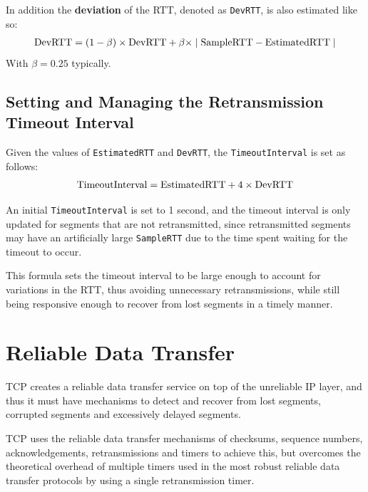 \documentclass[12pt letter]{report}
\begin{document}
In addition the \textbf{deviation} of the RTT, denoted as
\lstinline{DevRTT}, is also estimated like so:
\begin{align*}
  \text{\lstinline{DevRTT}} = (1 - \beta) \times
  \text{\lstinline{DevRTT}} + \beta \times  \mid \text{\lstinline{SampleRTT}} -
  \text{\lstinline{EstimatedRTT}} \mid
\end{align*}
With $\beta = 0.25$ typically.

\subsection{Setting and Managing the Retransmission Timeout Interval}

Given the values of \lstinline{EstimatedRTT} and \lstinline{DevRTT},
the \lstinline{TimeoutInterval} is set as follows:
\begin{align*}
  \text{\lstinline{TimeoutInterval}} =
  \text{\lstinline{EstimatedRTT}} + 4 \times
  \text{\lstinline{DevRTT}}
\end{align*}

An initial \lstinline{TimeoutInterval} is set to 1 second, and the
timeout interval is only updated for segments that are not
retransmitted, since retransmitted segments may have an artificially
large \lstinline{SampleRTT} due to the time spent waiting for the
timeout to occur.

This formula sets the timeout interval to be large enough to account
for variations in the RTT, thus avoiding unnecessary retransmissions,
while still being responsive enough to recover from lost segments in
a timely manner.

\section{Reliable Data Transfer}

TCP creates a reliable data transfer service on top of the unreliable
IP layer, and thus it must have mechanisms to detect and recover from
lost segments, corrupted segments and excessively delayed segments.

TCP uses the reliable data transfer mechanisms of checksums, sequence
numbers, acknowledgements, retransmissions and timers to achieve
this, but overcomes the theoretical overhead of multiple timers used
in the most robust reliable data transfer protocols by using a single
retransmission timer.
\end{document}

